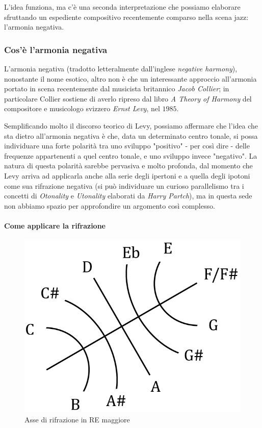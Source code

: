 \documentclass[12pt]{article}
\begin{document}
L'idea funziona, ma c'è una seconda interpretazione che possiamo elaborare sfruttando un espediente compositivo recentemente comparso nella scena jazz: l'armonia negativa.

\subsubsection{Cos'è l'armonia negativa}
L'armonia negativa (tradotto letteralmente dall'inglese \emph{negative harmony}), nonostante il nome esotico, altro non è che un interessante approccio all'armonia portato in scena recentemente dal musicista britannico \emph{Jacob Collier}; in particolare Collier sostiene di averlo ripreso dal libro \emph{A Theory of Harmony} del compositore e musicologo svizzero \emph{Ernst Levy}, nel \(1985\).

Semplificando molto il discorso teorico di Levy, possiamo affermare che l'idea che sta dietro all'armonia negativa è che, data un determinato centro tonale, si possa individuare una forte polarità tra uno sviluppo "positivo" - per così dire - delle frequenze appartenenti a quel centro tonale, e uno sviluppo invece "negativo". La natura di questa polarità sarebbe pervasiva e molto profonda, dal momento che Levy arriva ad applicarla anche alla serie degli ipertoni e a quella degli ipotoni come sua rifrazione negativa (si può individuare un curioso parallelismo tra i concetti di \emph{Otonality} e \emph{Utonality} elaborati da \emph{Harry Partch}), ma in questa sede non abbiamo spazio per approfondire un argomento così complesso.

\paragraph{Come applicare la rifrazione}
\begin{figure}
 \includegraphics[width=\linewidth]{aa/na-circle}
 \caption{Asse di rifrazione in RE maggiore}
 \label{fig:na}
 \centering
\end{figure}
\end{document}
